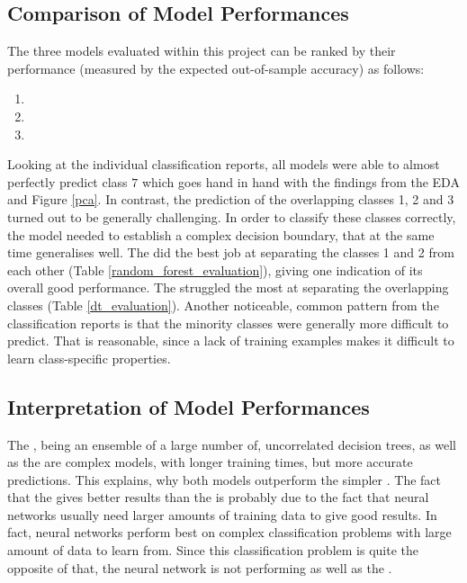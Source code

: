 \subsection{Comparison of Model Performances}
The three models evaluated within this project can be ranked by their performance (measured by the expected out-of-sample accuracy) as follows:

\begin{enumerate}
    \item {}
    \item {}
    \item {}
\end{enumerate}

Looking at the individual classification reports, all models were able to almost perfectly predict class $7$ which goes hand in hand with the findings from the EDA and Figure \ref{pca}. In contrast, the prediction of the overlapping classes 1, 2 and 3 turned out to be generally challenging. In order to classify these classes correctly, the model needed to establish a complex decision boundary, that at the same time generalises well. The  did the best job at separating the classes 1 and 2 from each other (Table \ref{random_forest_evaluation}), giving one indication of its overall good performance. The  struggled the most at separating the overlapping classes (Table \ref{dt_evaluation}). 
Another noticeable, common pattern from the classification reports is that the minority classes were generally more difficult to predict. That is reasonable, since a lack of training examples makes it difficult to learn class-specific properties.

\subsection{Interpretation of Model Performances}
The , being an ensemble of a large number of, uncorrelated decision trees, as well as the  are complex models, with longer training times, but more accurate predictions. This explains, why both models outperform the simpler . 
The fact that the  gives better results than the  is probably due to the fact that neural networks usually need larger amounts of training data to give good results. In fact, neural networks perform best on complex classification problems with large amount of data to learn from. Since this classification problem is quite the opposite of that, the neural network is not performing as well as the .

